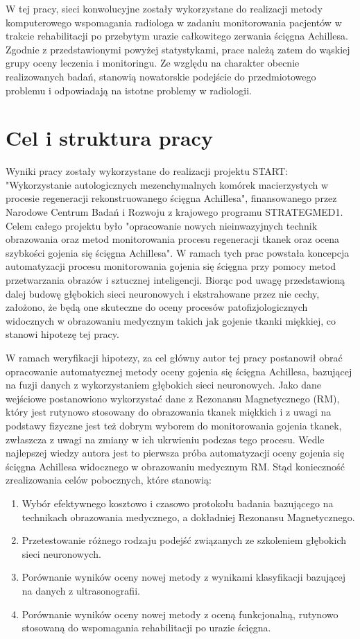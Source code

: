 W tej pracy, sieci konwolucyjne zostały wykorzystane do realizacji metody komputerowego wspomagania radiologa w zadaniu monitorowania pacjentów w trakcie rehabilitacji po przebytym urazie całkowitego zerwania ścięgna Achillesa. Zgodnie \linebreak z przedstawionymi powyżej statystykami, prace należą zatem do wąskiej grupy oceny leczenia i monitoringu. Ze względu na charakter obecnie realizowanych badań, stanowią nowatorskie podejście do przedmiotowego problemu i odpowiadają na istotne problemy w radiologii.


\chapter{Cel i struktura pracy}

Wyniki pracy zostały wykorzystane do realizacji projektu START: "Wykorzystanie autologicznych mezenchymalnych komórek macierzystych w procesie regeneracji rekonstruowanego ścięgna Achillesa", finansowanego przez Narodowe Centrum Badań i Rozwoju z krajowego programu STRATEGMED1. Celem całego projektu było "opracowanie nowych nieinwazyjnych technik obrazowania oraz metod monitorowania procesu regeneracji tkanek oraz ocena szybkości gojenia się ścięgna Achillesa". \linebreak W ramach tych prac powstała koncepcja automatyzacji procesu monitorowania gojenia się ścięgna przy pomocy metod przetwarzania obrazów i sztucznej inteligencji. Biorąc pod uwagę przedstawioną dalej budowę głębokich sieci neuronowych i ekstrahowane przez nie cechy, założono, że będą one skuteczne do oceny procesów patofizjologicznych widocznych w obrazowaniu medycznym takich jak gojenie tkanki miękkiej, co stanowi hipotezę tej pracy.

W ramach weryfikacji hipotezy, za cel główny autor tej pracy postanowił obrać opracowanie automatycznej metody oceny gojenia się ścięgna Achillesa, bazującej na fuzji danych z wykorzystaniem głębokich sieci neuronowych. Jako dane wejściowe postanowiono wykorzystać dane z Rezonansu Magnetycznego (RM), który jest rutynowo stosowany do obrazowania tkanek miękkich i z uwagi na podstawy fizyczne jest też dobrym wyborem do monitorowania gojenia tkanek, zwłaszcza z uwagi na zmiany w ich ukrwieniu podczas tego procesu. Wedle najlepszej wiedzy autora jest to pierwsza próba automatyzacji oceny gojenia się ścięgna Achillesa widocznego w obrazowaniu medycznym RM. Stąd konieczność zrealizowania celów pobocznych, które stanowią:
\begin{enumerate}
	\item Wybór efektywnego kosztowo i czasowo protokołu badania bazującego na technikach obrazowania medycznego, a dokładniej Rezonansu Magnetycznego.
	\item Przetestowanie różnego rodzaju podejść związanych ze szkoleniem głębokich sieci neuronowych.
	\item Porównanie wyników oceny nowej metody z wynikami klasyfikacji bazującej na danych z ultrasonografii.
	\item Porównanie wyników oceny nowej metody z oceną funkcjonalną, rutynowo stosowaną do wspomagania rehabilitacji po urazie ścięgna.
\end{enumerate}

